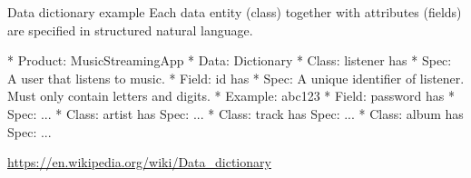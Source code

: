 \begin{Slide}{Data dictionary example}
Each data entity (class) together with attributes (fields) are specified in structured natural language.

\begin{Code}[language=reqt]
* Product: MusicStreamingApp
* Data: Dictionary
  * Class: listener has
    * Spec: A user that listens to music.
    * Field: id has
      * Spec: A unique identifier of listener. Must only contain letters and digits.
      * Example: abc123
    * Field: password has
      * Spec: ...
  * Class: artist has Spec: ...
  * Class: track has Spec: ...
  * Class: album has Spec: ...
\end{Code}

{\small\url{https://en.wikipedia.org/wiki/Data_dictionary}}
\end{Slide}
